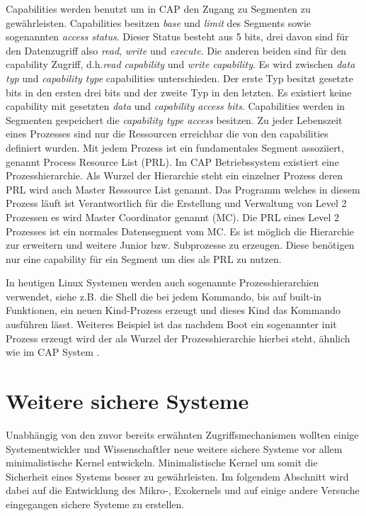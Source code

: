 \documentclass[11pt,technote]{IEEEtran}
\begin{document}
		     Capabilities werden benutzt um in CAP den Zugang zu Segmenten zu gew\"ahrleisten.
		     Capabilities besitzen \textit{base} und \textit{limit} des Segments sowie sogenannten \textit{access status}. Dieser Status
		     besteht aus 5 bits, drei davon sind f\"ur den Datenzugriff also \textit{read}, \textit{write} und \textit{execute}.
		     Die anderen beiden sind f\"ur den capability Zugriff, d.h.\textit{read capability} und \textit{write capability}.
		     Es wird zwischen \textit{data typ} und \textit{capability type} capabilities unterschieden. Der erste Typ besitzt gesetzte bits in den ersten drei bits 
		     und der zweite Typ in den letzten. Es existiert keine capability mit gesetzten \textit{data} und \textit{capability access bits}.
		     Capabilities werden in Segmenten gespeichert die \textit{capability type access} besitzen.
		     Zu jeder Lebenszeit eines Prozesses sind nur die Ressourcen erreichbar die von den capabilities definiert wurden.
		     Mit jedem Prozess ist ein fundamentales Segment assoziiert, genannt Process Resource List (PRL). 
		     Im CAP Betriebssystem existiert eine Prozesshierarchie. Als Wurzel der Hierarchie steht ein einzelner Prozess deren PRL wird auch Master Ressource List 
		     genannt. Das Programm welches in diesem Prozess l\"auft ist Verantwortlich f\"ur die Erstellung und Verwaltung von Level 2 
		     Prozessen es wird Master Coordinator genannt (MC).
		     Die PRL eines Level 2 Prozesses ist ein normales Datensegment vom MC. Es ist m\"oglich die Hierarchie zur erweitern und weitere Junior
		     bzw. Subprozesse zu erzeugen. Diese ben\"otigen nur eine capability f\"ur ein Segment um dies als PRL zu nutzen.
		     
		     In heutigen Linux Systemen werden auch sogenannte Prozesshierarchien verwendet, siehe z.B. die Shell die bei jedem
		     Kommando, bis auf built-in Funktionen, ein neuen Kind-Prozess erzeugt und dieses Kind das Kommando ausf\"uhren l\"asst. Weiteres Beispiel
		     ist das nachdem Boot ein sogenannter init Prozess erzeugt wird der als Wurzel der Prozesshierarchie hierbei steht, \"ahnlich wie 
		     im CAP System \cite{Url:linux:processes}.
		     
  \section{Weitere sichere Systeme} \label{sec:other}
    Unabh\"angig von den zuvor bereits erw\"ahnten Zugriffsmechanismen wollten einige Systementwickler und Wissenschaftler neue weitere sichere Systeme
    vor allem minimalistische Kernel entwickeln. Minimalistische Kernel um somit die Sicherheit eines Systems besser zu gew\"ahrleisten.
    Im folgendem Abschnitt wird dabei auf die Entwicklung des Mikro-, Exokernels und auf einige andere Versuche eingegangen sichere Systeme zu erstellen.
\end{document}
